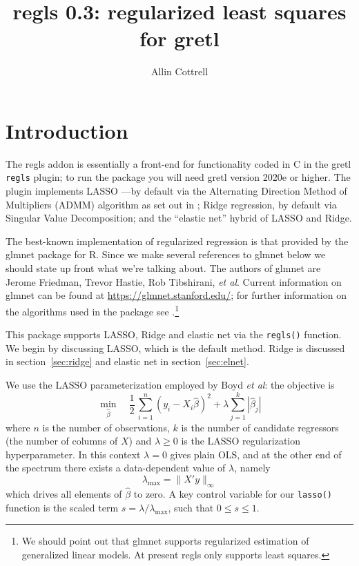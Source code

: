 \documentclass{article}
\title{regls 0.3: regularized least squares for gretl}
\author{Allin Cottrell}
\begin{document}
\maketitle

\section{Introduction}
\label{sec:intro}

The \textsf{regls} addon is essentially a front-end for functionality
coded in C in the gretl \texttt{regls} plugin; to run the package you
will need gretl version 2020e or higher.  The plugin implements LASSO
\citep{tibshirani96}---by default via the Alternating Direction Method
of Multipliers (ADMM) algorithm as set out in \cite{boyd2010}; Ridge
regression, by default via Singular Value Decomposition; and the
``elastic net'' hybrid of LASSO and Ridge.

The best-known implementation of regularized regression is that
provided by the \textsf{glmnet} package for \textsf{R}. Since we make
several references to \textsf{glmnet} below we should state up front
what we're talking about. The authors of \textsf{glmnet} are Jerome
Friedman, Trevor Hastie, Rob Tibshirani, \textit{et al}.  Current
information on \textsf{glmnet} can be found at
\url{https://glmnet.stanford.edu/}; for further information on the
algorithms used in the package see \cite{glmnet10}.\footnote{We should
  point out that \textsf{glmnet} supports regularized estimation of
  generalized linear models. At present \textsf{regls} only supports
  least squares.}

This package supports LASSO, Ridge and elastic net via the
\texttt{regls()} function. We begin by discussing LASSO, which is the
default method.  Ridge is discussed in section~\ref{sec:ridge} and
elastic net in section~\ref{sec:elnet}.

We use the LASSO parameterization employed by Boyd \textit{et al}: the
objective is
\begin{equation}
  \label{eq:obj}
  \min_{\hat{\beta}} \quad \frac{1}{2}\,
  \sum_{i=1}^n (y_i - X_i\hat{\beta})^2 + \lambda \sum_{j=1}^k |\hat{\beta}_j|
\end{equation}
where $n$ is the number of observations, $k$ is the number of
candidate regressors (the number of columns of $X$) and
$\lambda \geq 0$ is the LASSO regularization hyperparameter. In this
context $\lambda = 0$ gives plain OLS, and at the other end of the
spectrum there exists a data-dependent value of $\lambda$, namely
\begin{equation}
  \label{eq:lmax}
  \lambda_{\max} = \|X'y\|_{\infty}
\end{equation}
which drives all elements of $\hat{\beta}$ to zero.  A key control
variable for our \texttt{lasso()} function is the scaled term
$s = \lambda/\lambda_{\max}$, such that $0 \leq s \leq 1$.
\end{document}
